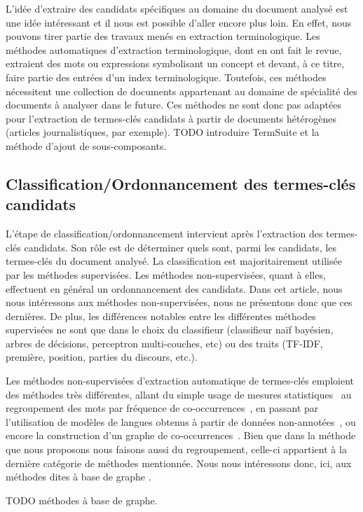     L'idée d'extraire des candidats spécifiques au domaine du document analysé
    est une idée intéressant et il nous est possible d'aller encore plus loin.
    En effet, nous pouvons tirer partie des travaux menés en extraction
    terminologique. Les méthodes automatiques d'extraction terminologique, dont
     en ont fait le revue,
    extraient des mots ou expressions symbolisant un concept et devant, à ce
    titre, faire partie des entrées d'un index terminologique. Toutefois, ces
    méthodes nécessitent une collection de documents appartenant au domaine de
    spécialité des documents à analyser dans le future. Ces méthodes ne sont
    donc pas adaptées pour l'extraction de termes-clés candidats à partir de
    documents hétérogènes (articles journalistiques, par exemple).
    TODO introduire TermSuite et la méthode d'ajout de sous-composants.

  \subsection{Classification/Ordonnancement des termes-clés candidats}
  \label{subsec:classification_ordonnancement_des_termes_cles_candidats}
    L'étape de classification/ordonnancement intervient après l'extraction des
    termes-clés candidats. Son rôle est de déterminer quels sont, parmi les
    candidats, les termes-clés du document analysé. La classification est
    majoritairement utilisée par les méthodes supervisées. Les méthodes
    non-supervisées, quant à elles,  effectuent en général un ordonnancement des
    candidats. Dans cet article, nous nous intéressons aux méthodes
    non-supervisées, nous ne présentons donc que ces dernières. De plus, les
    différences notables entre les différentes méthodes supervisées ne sont que
    dans le choix du classifieur (classifieur naïf bayésien, arbres de
    décisions, perceptron multi-couches, etc) ou des traits (TF-IDF, première,
    position, parties du discours, etc.).

    Les méthodes non-supervisées d'extraction automatique de termes-clés
    emploient des méthodes très différentes, allant du simple usage de mesures
    statistiques~\cite{jones1972tfidf,paukkeri2010likey} au regroupement des
    mots par fréquence de co-occurrences~\cite{liu2009keycluster}, en passant
    par l'utilisation de modèles de langues obtenus à partir de données
    non-annotées~\cite{tomokiyo2003languagemodel}, ou encore la construction
    d'un graphe de co-occurrences~\cite{mihalcea2004textrank}. Bien que dans la
    méthode que nous proposons nous faisons aussi du regroupement, celle-ci
    appartient à la dernière catégorie de méthodes mentionnée. Nous nous
    intéressons donc, ici, aux méthodes dites \og à base de graphe \fg.

    TODO méthodes à base de graphe.


